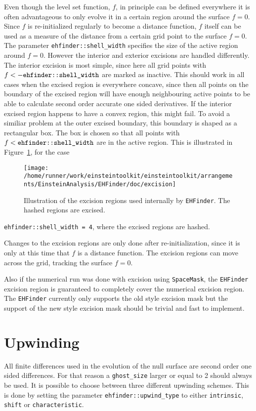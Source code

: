 Even though the level set function, $f$, in principle can be defined
everywhere it is often advantageous to only evolve it in a certain region
around the surface $f=0$. Since $f$ is re-initialized regularly to become
a distance function, $f$ itself can be used as a measure of the distance
from a certain grid point to the surface $f=0$. The parameter
{\tt ehfinder::shell\_width} specifies the size of the active region
around $f=0$. However the interior and exterior excisions are handled
differently. The interior excision is most simple, since here all grid points
with $f<-{\mbox{\tt ehfinder::shell\_width}}$ are marked as inactive. This
should work in all cases when the excised region is everywhere concave, since
then all points on the boundary of the excised region will have enough
neighbouring active points to be able to calculate second order accurate one
sided derivatives. If the interior excised region happens to have a convex
region, this might fail. To avoid a similiar problem at the outer excised
boundary, this boundary is shaped as a rectangular box. The box is chosen
so that all points with $f<{\mbox{\tt ehfinder::shell\_width}}$ are in the
active region. This is illustrated in
Figure~\ref{AEIThorns_EHFinder_excisefig}, for the case
\begin{figure}[ht]
  \begin{center}
    \texttt{[image: /home/runner/work/einsteintoolkit/einsteintoolkit/arrangements/EinsteinAnalysis/EHFinder/doc/excision]}
  \end{center}
  \caption{Illustration of the excision regions used internally by
           {\tt EHFinder}. The hashed regions are excised.}
  \label{AEIThorns_EHFinder_excisefig}
\end{figure}
{\tt ehfinder::shell\_width = 4}, where the excised regions are hashed.

Changes to the excision regions are only done after re-initialization,
since it is only at this time that $f$ is a distance function. The excision
regions can move across the grid, tracking the surface $f=0$.

Also if the numerical run was done with excision using {\tt SpaceMask},
the {\tt EHFinder} excision region is guaranteed to completely cover the 
numerical excision region. The {\tt EHFinder} currently only supports the
old style excision mask but the support of the new style excision mask
should be trivial and fast to implement.
\section{Upwinding}
\label{AEIThorns_EHFinder_upwind}
All finite differences used in the evolution of the null surface are second
order one sided differences. For that reason a {\tt ghost\_size} larger or
equal to 2 should always be used. It is possible to choose between three
different upwinding schemes. This is done by setting the parameter
{\tt ehfinder::upwind\_type} to either {\tt intrinsic}, {\tt shift} or
{\tt characteristic}.


